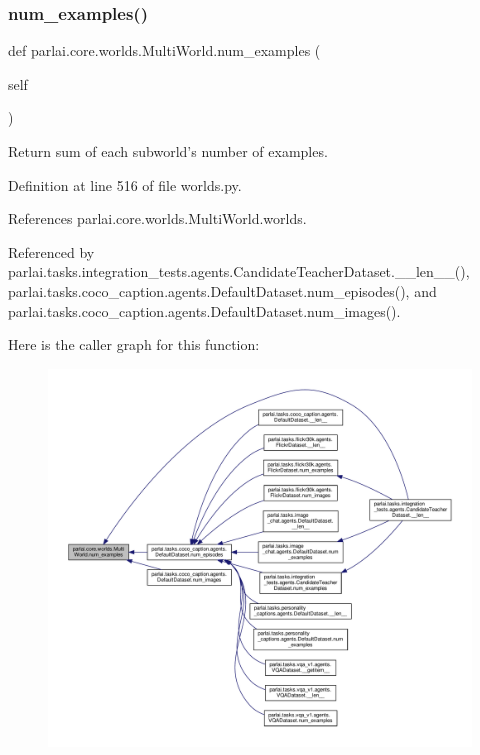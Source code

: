 \subsubsection{\texorpdfstring{num\+\_\+examples()}{num\_examples()}}
{\footnotesize\ttfamily def parlai.\+core.\+worlds.\+Multi\+World.\+num\+\_\+examples (\begin{DoxyParamCaption}\item[{}]{self }\end{DoxyParamCaption})}

\begin{DoxyVerb}Return sum of each subworld's number of examples.\end{DoxyVerb}
 

Definition at line 516 of file worlds.\+py.



References parlai.\+core.\+worlds.\+Multi\+World.\+worlds.



Referenced by parlai.\+tasks.\+integration\+\_\+tests.\+agents.\+Candidate\+Teacher\+Dataset.\+\_\+\+\_\+len\+\_\+\+\_\+(), parlai.\+tasks.\+coco\+\_\+caption.\+agents.\+Default\+Dataset.\+num\+\_\+episodes(), and parlai.\+tasks.\+coco\+\_\+caption.\+agents.\+Default\+Dataset.\+num\+\_\+images().

Here is the caller graph for this function\+:
\nopagebreak
\begin{figure}[H]
\begin{center}
\leavevmode
\includegraphics[width=350pt]{classparlai_1_1core_1_1worlds_1_1MultiWorld_ae62ad8500e4208ed99ffcf91707746e1_icgraph}
\end{center}
\end{figure}
\mbox{\label{classparlai_1_1core_1_1worlds_1_1MultiWorld_aae71b8182e17a1579352a52b56614b64}} 
